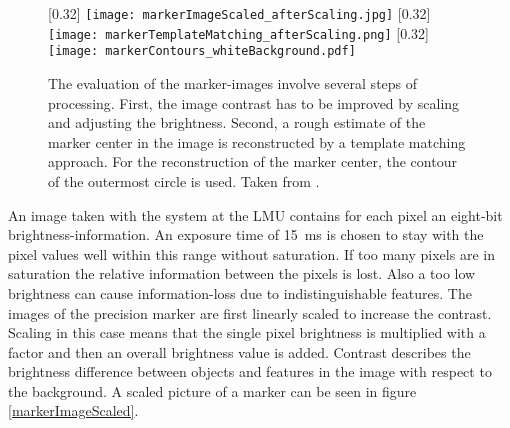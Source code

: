 \documentclass[
twoside,            %
BCOR1.4cm,          %
10pt,               %
headings=normal,    %
headsepline,        %
clearplainpage,		%
final,              %
div=14,
open=right,
bibliography=toc
]{scrreprt}
\begin{document}
\begin{figure}[!h]
	\centering
	[0.32\textwidth]
	{\texttt{[image: markerImageScaled\_afterScaling.jpg]}}
	\hfill
	[0.32\textwidth]
	{\texttt{[image: markerTemplateMatching\_afterScaling.png]}}
	\hfill
	[0.32\textwidth] 
	{\texttt{[image: markerContours\_whiteBackground.pdf]}}
	\vspace{-2mm}
	\caption{
		The evaluation of the marker-images involve several steps of processing.
		First, the image contrast has to be improved by scaling and adjusting the brightness.
		Second, a rough estimate of the marker center in the image is reconstructed by a template matching approach.
		For the reconstruction of the marker center, the contour of the outermost circle is used.
		Taken from \cite{neubertThesis}.
	}
	\label{markerImageEvaluation} 
\end{figure}

An image taken with the system at the LMU contains for each pixel an eight-bit brightness-information.
An exposure time of \SI{15}{ms} is chosen to stay with the pixel values well within this range without saturation.
If too many pixels are in saturation the relative information between the pixels is lost.
Also a too low brightness can cause information-loss due to indistinguishable features.
The images of the precision marker are first linearly scaled to increase the contrast.
Scaling in this case means that the single pixel brightness is multiplied with a factor and then an overall brightness value is added.
Contrast describes the brightness difference between objects and features in the image with respect to the background.
A scaled picture of a marker can be seen in figure \ref{markerImageScaled}.
\end{document}
